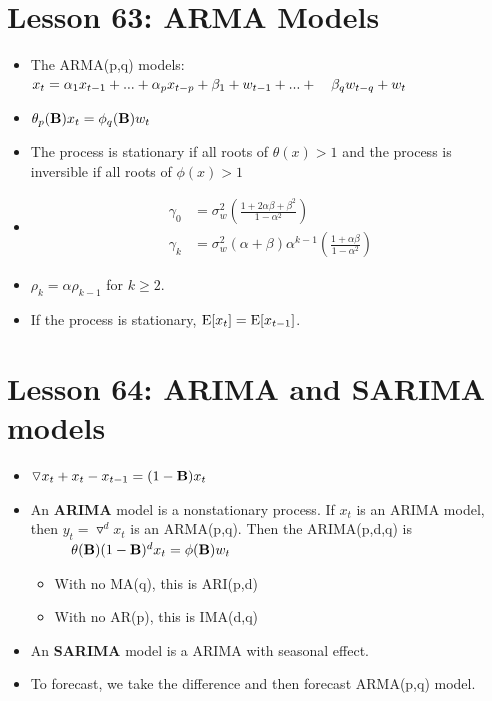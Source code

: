 \documentclass[10pt, french]{article}
\begin{document}
\begin{multicols*}{3}
\section*{Lesson 63: ARMA Models}
\begin{itemize}[align=left,leftmargin=*]
   \item The ARMA(p,q) models:\\
   $x_t = \alpha_1 x_{t-1} + ... + \alpha_p x_{t-p} + \beta_1 + w_{t-1} + ... + \hspace*{0.35cm} \beta_q w_{t-q} + w_t$
   \item[] $\theta_p(\mathbf{B})x_t = \phi_q(\mathbf{B})w_t$
   \item The process is stationary if all roots of $\theta(x)>1$ and the process is inversible if all roots of $\phi(x)>1$
   \item[]
    \begin{align*}
      \gamma_0 &= \sigma_w^2 \left(\frac{1 + 2\alpha\beta + \beta^2}{1 - \alpha^2} \right)  \\
      \gamma_k &= \sigma_w^2 (\alpha + \beta) \alpha^{k-1}\left(\frac{1+\alpha\beta}{1 - \alpha^2}\right)
    \end{align*}
    \item[] $\rho_k = \alpha\rho_{k-1}$ for $k\geq2$.
    \item If the process is stationary, $\mathrm{E} {\left[ x_t \right]} = \mathrm{E} {\left[ x_{t-1} \right]}$. 
\end{itemize}

\section*{Lesson 64: ARIMA and SARIMA models}
\begin{itemize}[align=left,leftmargin=*]
    \item $\triangledown x_t + x_t - x_{t-1} = (1 - \mathbf{B})x_t$
   \item An \textbf{ARIMA} model is a nonstationary process. If $x_t$ is an ARIMA model, then $y_t = \triangledown^d x_t$ is an ARMA(p,q). Then the ARIMA(p,d,q) is \\
   $\hspace*{1cm} \theta(\mathbf{B})(1-\mathbf{B})^d x_t = \phi(\mathbf{B})w_t$
   \begin{itemize}
     \item With no MA(q), this is ARI(p,d)
     \item With no AR(p), this is IMA(d,q)  
   \end{itemize}
   \item An \textbf{SARIMA} model is a ARIMA with seasonal effect.
   \item To forecast, we take the difference and then forecast ARMA(p,q) model.
\end{itemize}




\end{multicols*}
\end{document}
